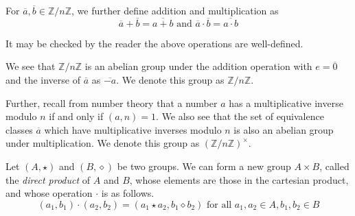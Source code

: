 For $\overline{a}, \overline{b}\in \mathbb{Z}/n\mathbb{Z}$, we further define addition and multiplication as
$$\overline{a}+\overline{b}=\overline{a+b}\text{ and }\overline{a}\cdot\overline{b}=\overline{a\cdot b}$$

It may be checked by the reader the above operations are well-defined.

We see that $\mathbb{Z}/n\mathbb{Z}$ is an abelian group under the addition operation with $e=\overline{0}$ and the inverse of $\overline{a}$ as $\overline{-a}$. We denote this group as $\mathbb{Z}/n\mathbb{Z}$.

Further, recall from number theory that a number $a$ has a multiplicative inverse modulo $n$ if and only if $(a,n)=1$. We also see that the set of equivalence classes $\overline{a}$ which have multiplicative inverses modulo $n$ is also an abelian group under multiplication. We denote this group as $(\mathbb{Z}/n\mathbb{Z})^\times$.


\begin{definition}
    Let $(A,\star)$ and $(B,\diamond)$ be two groups. We can form a new group $A\times B$, called the \textit{direct product} of $A$ and $B$, whose elements are those in the cartesian product, and whose operation $\cdot$ is as follows.
    $$(a_1,b_1)\cdot(a_2,b_2)=(a_1\star a_2, b_1\diamond b_2)\text{ for all }a_1,a_2\in A, b_1,b_2\in B$$
\end{definition}

